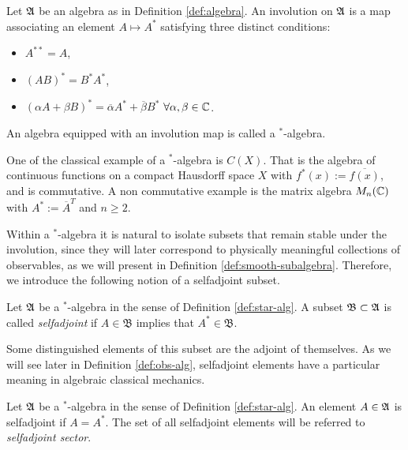 	\begin{definition}[$^*$-algebra]\label{def:star-alg}
		Let $\mathfrak{A}$ be an algebra as in Definition \ref{def:algebra}. An involution on $\mathfrak{A}$ is a map associating an element $A \mapsto A^*$ satisfying three distinct conditions:
		\begin{itemize}
			\item $A^{**} = A$,
			\item $(AB)^* = B^* A^*$,
			\item $(\alpha A + \beta B)^* = \overline{\alpha} A^* + \overline{\beta} B^*$ $\forall \alpha, \beta \in \mathbb{C}$.
		\end{itemize}
		An algebra equipped with an involution map is called a $^*$-algebra. 
	\end{definition}
	
	\begin{example}\label{ex:model-star-alg}
		One of the classical example of a $^*$-algebra is $C(X)$. That is the algebra of continuous functions on a compact Hausdorff space $X$ with $f^*(x) := \overline{f(x)}$, and is commutative. A non commutative example is the matrix algebra $M_n(\mathbb{C})$ with $A^* := \overline{A}^T$ and $n \geq 2$.
	\end{example}
	
	Within a $^*$-algebra it is natural to isolate subsets that remain stable under the involution, since they will later correspond to physically meaningful collections of observables, as we will present in Definition \ref{def:smooth-subalgebra}. Therefore, we introduce the following notion of a selfadjoint subset.
	
	\begin{definition}\label{def:selfadj-subset}
		Let $\mathfrak{A}$ be a $^*$-algebra in the sense of Definition \ref{def:star-alg}. A subset $\mathfrak{B} \subset \mathfrak{A}$ is called \emph{selfadjoint} if $A \in \mathfrak{B}$ implies that $A^* \in \mathfrak{B}$.
	\end{definition}
	
	\noindent Some distinguished elements of this subset are the adjoint of themselves. As we will see later in Definition \ref{def:obs-alg}, selfadjoint elements have a particular meaning in algebraic classical mechanics.
	
	\begin{definition}\label{def:selfadj-element}
		Let $\mathfrak{A}$ be a $^*$-algebra in the sense of Definition \ref{def:star-alg}. An element $A \in \mathfrak{A}$ is selfadjoint if $A = A^*$. The set of all selfadjoint elements will be referred to \emph{selfadjoint sector}.
	\end{definition}
	
